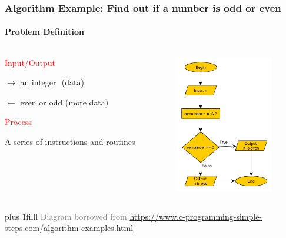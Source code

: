 \documentclass{beamer}
\newcommand{\btVFill}{\vskip0pt plus 1filll}
\newcommand{\light}[1]{\textcolor{gray}{#1}}
\newcommand{\red}[1]{\textcolor{red}{#1}}
\begin{document}
\begin{frame}
\frametitle{Algorithm Example: Find out if a number is odd or even}
\framesubtitle{Problem Definition}
\begin{columns}

\begin{column}{0.5\textwidth}
\red{Input/Output}

$\rightarrow$ an integer\,\,\,\,(data)

$\leftarrow$ even or odd 	(more data)	\pause 

\bigskip
\red{Process}

A series of instructions and routines
\end{column}

\begin{column}{0.4\textwidth}
\begin{center}
\includegraphics[width=43mm]{img/even-or-odd.png}
\end{center}
\end{column}
\end{columns}
\btVFill
\onslide
\footnotesize
\light{
Diagram borrowed from 
\url{https://www.c-programming-simple-steps.com/algorithm-examples.html}}
\end{frame}
\end{document}
